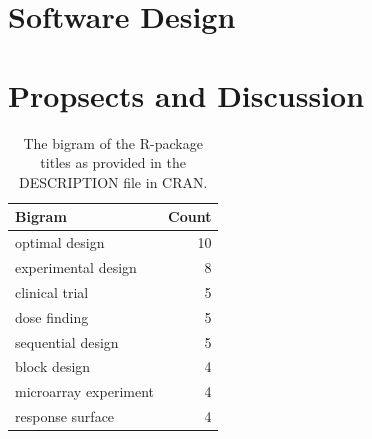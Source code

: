 \hypertarget{software-design}{%
\section{Software Design}\label{software-design}}

\hypertarget{propsects-and-discussion}{%
\section{Propsects and Discussion}\label{propsects-and-discussion}}

\newpage

\begin{Schunk}
\begin{table}

\caption{\label{tab:bigram-title}The bigram of the R-package titles as provided in the DESCRIPTION file in CRAN.}
\centering
\begin{tabular}[t]{lr}
\toprule
Bigram & Count\\
\midrule
optimal design & 10\\
experimental design & 8\\
clinical trial & 5\\
dose finding & 5\\
sequential design & 5\\
block design & 4\\
microarray experiment & 4\\
response surface & 4\\
\bottomrule
\end{tabular}
\end{table}

\end{Schunk}

